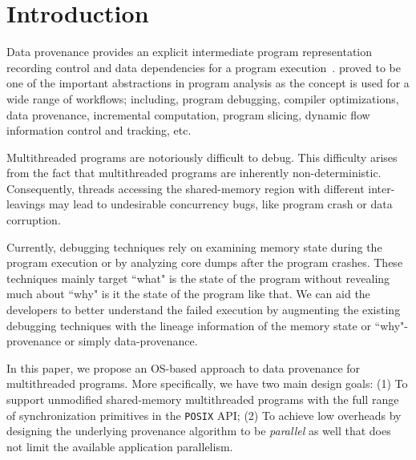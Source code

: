 \section{Introduction}
\label{sec:introduction}

Data provenance provides an explicit intermediate program representation recording control and data dependencies for a program execution~\cite{pdg-pingali}.  proved to be one of the important abstractions in program analysis as the concept is used for a wide range of workflows; including, program debugging, compiler optimizations, data provenance, incremental computation, program slicing, dynamic flow information control and tracking,  etc.


Multithreaded programs are notoriously difficult to debug. This difficulty arises from the fact that multithreaded programs are inherently non-deterministic. Consequently, threads accessing the shared-memory region with different inter-leavings may lead to undesirable concurrency bugs, like program crash or data corruption. 


Currently, debugging techniques rely on examining memory state during the program execution or by analyzing core dumps after the program crashes. These techniques mainly target ``what" is the state of the program without revealing much about ``why" is it the state of the program like that. We can aid the developers to better understand the failed execution by augmenting the existing debugging techniques with the lineage information of the memory state or ``why"-provenance or simply data-provenance.

 \fi



In this paper, we propose an OS-based approach to data provenance for multithreaded programs. More specifically, we have two main design goals: (1) To support unmodified shared-memory multithreaded programs with the full range of synchronization primitives in the {\tt POSIX} API; (2) To achieve low overheads by designing the underlying provenance algorithm to be  {\em parallel} as well that does not limit the available application parallelism.


